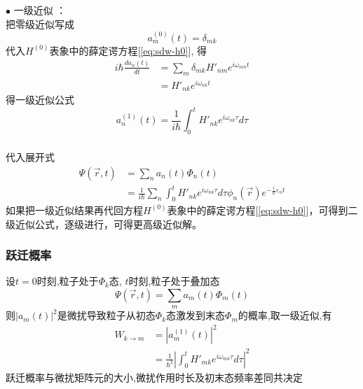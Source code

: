 \begin{frame} 
  \frametitle{}
  $\bullet$ 一级近似 ：\\
  把零级近似写成
  \[ a^{(0)}_m(t) = \delta _{mk}\]
  代入$H^{(0)}$表象中的薛定谔方程[\ref{eq:sdw-h0}], 得 
  \begin{equation*}
    \begin{aligned}
      i \hbar \frac{d a_n(t)}{d t} &= \sum_m \delta _{mk} H'_{nm}  e^{i \omega _{nm} t}  \\ 
      &= H'_{nk}  e^{i \omega _{nk} t}
    \end{aligned}
    \end{equation*}
  得一级近似公式
  \[ a^{(1)}_n(t) = \frac{1}{i\hbar}\int_{0}^{t} H'_{nk}  e^{i \omega _{nk} \tau} d\tau\]
\end{frame} 

\begin{frame} 
  \frametitle{}
  代入展开式
  \begin{equation*}
    \begin{aligned}
      \Psi(\vec{r},t) &= \sum_n a_n(t)\Phi _n(t) \\
      &=  \frac{1}{i\hbar} \sum_n \int_{0}^{t} H'_{nk}  e^{i \omega _{nk} \tau} d\tau \phi _n(\vec{r})e^{-\frac{i}{\hbar}\varepsilon _n t} 
    \end{aligned}
  \end{equation*}
  如果把一级近似结果再代回方程$H^{(0)}$表象中的薛定谔方程[\ref{eq:sdw-h0}]，可得到二级近似公式，逐级进行，可得更高级近似解。
\end{frame} 

\begin{frame} 
  \frametitle{跃迁概率}
设$t=0$时刻,粒子处于$\Phi _k$态, $t$时刻,粒子处于叠加态
\begin{equation*}
  \Psi(\vec{r},t) = \sum_m a_m(t)\Phi _m(t)
\end{equation*}
则$\left\vert a_m(t)\right\vert ^2$是微扰导致粒子从初态$\Phi _k$态激发到末态$\Phi _m $的概率,取一级近似,有
\begin{equation*}
  \begin{aligned}
    W_{k\to m} &= \left\vert a^{(1)}_m(t)\right\vert ^2 \\
    &= \frac{1}{\hbar^2} \left\vert \int_{0}^{t} H'_{mk}  e^{i \omega _{mk} \tau} d\tau \right\vert ^2 
  \end{aligned}
\end{equation*}
跃迁概率与微扰矩阵元的大小,微扰作用时长及初末态频率差同共决定
\end{frame} 

